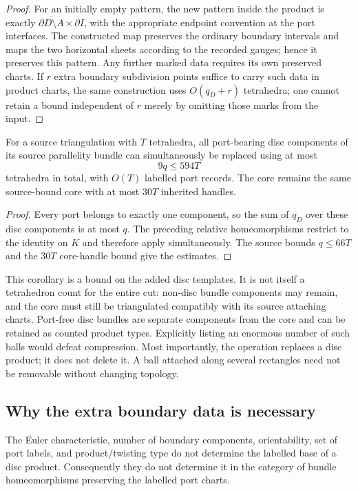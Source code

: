\begin{proof}
For an initially empty pattern, the new pattern inside the product is
exactly $\overline{\partial D\setminus A}\times\partial I$, with the
appropriate endpoint convention at the port interfaces.  The constructed
map preserves the ordinary boundary intervals and maps the two horizontal
sheets according to the recorded gauges; hence it preserves this pattern.
Any further marked data requires its own preserved charts.  If $r$ extra
boundary subdivision points suffice to carry such data in product charts,
the same construction uses $O(q_D+r)$ tetrahedra; one cannot retain a bound
independent of $r$ merely by omitting those marks from the input.
\end{proof}

\begin{corollary}
For a source triangulation with $T$ tetrahedra, all port-bearing disc
components of its source parallelity bundle can simultaneously be replaced
using at most
\[
 9q\leq594T
\]
tetrahedra in total, with $O(T)$ labelled port records.  The core remains
the same source-bound core with at most $30T$ inherited handles.
\end{corollary}

\begin{proof}
Every port belongs to exactly one component, so the sum of $q_D$ over these
disc components is at most $q$.  The preceding relative homeomorphisms
restrict to the identity on $K$ and therefore apply simultaneously.  The
source bounds $q\leq66T$ and the $30T$ core-handle bound give the estimates.
\end{proof}

This corollary is a bound on the added disc templates.  It is not itself a
tetrahedron count for the entire cut: non-disc bundle components may remain,
and the core must still be triangulated compatibly with its source attaching
charts.  Port-free disc bundles are separate components from the core and
can be retained as counted product types.  Explicitly listing an enormous
number of such balls would defeat compression.  Most importantly, the
operation replaces a disc product; it does not delete it.  A ball attached
along several rectangles need not be removable without changing topology.

\subsection{Why the extra boundary data is necessary}

\begin{proposition}
The Euler characteristic, number of boundary components, orientability,
set of port labels, and product/twisting type do not determine the labelled
base of a disc product.  Consequently they do not determine it in the
category of bundle homeomorphisms preserving the labelled port charts.
\end{proposition}

